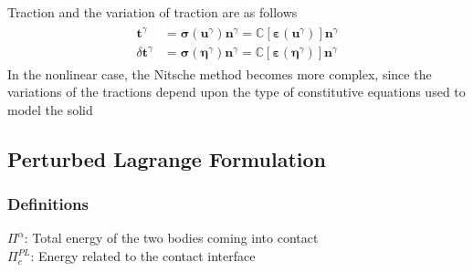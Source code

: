 \documentclass[12pt,3p]{article}
\numberwithin{equation}{section}
\begin{document}
Traction and the variation of traction are as follows 
\begin{align}\label{649}
\begin{split}
\mathbf{t}^\gamma &= \pmb{\sigma} (\mathbf{u}^\gamma) \mathbf{n}^\gamma = \mathbb{C} [\pmb{\varepsilon} (\mathbf{u}^\gamma)] \mathbf{n}^\gamma \\
\delta \mathbf{t}^\gamma &=  \pmb{\sigma} (\pmb{\eta}^\gamma) \mathbf{n}^\gamma = \mathbb{C} [\pmb{\varepsilon} (\pmb{\eta}^\gamma)] \mathbf{n}^\gamma
\end{split}
\end{align}
In the nonlinear case, the Nitsche method becomes more complex, since the variations of the tractions depend upon the type of constitutive equations used to model the solid

\subsection{Perturbed Lagrange Formulation}
\subsubsection{Definitions}
$\Pi^\alpha$: Total energy of the two bodies coming into contact \\
$\Pi_c^{PL}$: Energy related to the contact interface
\end{document}
